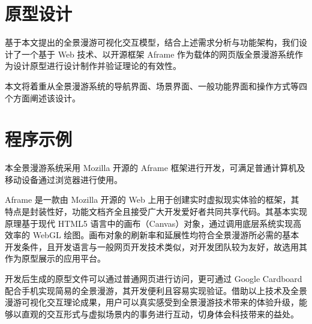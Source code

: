 \section{原型设计}
基于本文提出的全景漫游可视化交互模型，结合上述需求分析与功能架构，我们设计了一个基于 Web 技术、以开源框架 Aframe 作为载体的网页版全景漫游系统作为设计原型进行设计制作并验证理论的有效性。

本文将着重从全景漫游系统的导航界面、场景界面、一般功能界面和操作方式等四个方面阐述该设计。


\section{程序示例}
本全景漫游系统采用 Mozilla 开源的 Aframe 框架进行开发，可满足普通计算机及移动设备通过浏览器进行使用。

Aframe 是一款由 Mozilla 开源的 Web 上用于创建实时虚拟现实体验的框架，其特点是封装性好，功能文档齐全且接受广大开发爱好者共同共享代码。其基本实现原理基于现代 HTML5 语言中的画布（Canvas）对象，通过调用底层系统实现高效率的 WebGL 绘图。画布对象的刷新率和延展性均符合全景漫游所必需的基本开发条件，且开发语言与一般网页开发技术类似，对开发团队较为友好，故选用其作为原型展示的应用平台。

开发后生成的原型文件可以通过普通网页进行访问，更可通过 Google Cardboard 配合手机实现简易的全景漫游，其开发便利且容易实现验证。借助以上技术及全景漫游可视化交互理论成果，用户可以真实感受到全景漫游技术带来的体验升级，能够以直观的交互形式与虚拟场景内的事务进行互动，切身体会科技带来的益处。
